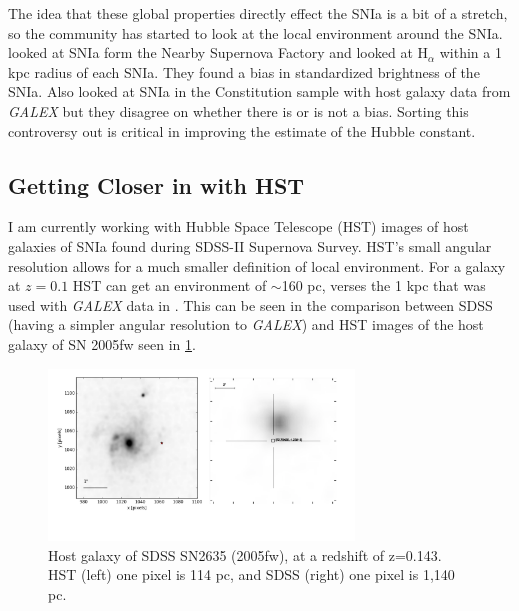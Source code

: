 \documentclass[apj, iop]{emulateapj}
\newcommand{\sn}{SNIa}
\newcommand{\todo}[1]{\textbf{\textcolor{red}{#1}}}
\newcommand{\Hubble}{\ensuremath{\text{H}_0}}
\begin{document}
The idea that these global properties directly effect the \sn{} is a bit of a
stretch, so the community has started to look at the local environment around
the \sn{}. \cite{Rigault13} looked at \sn{} form the Nearby Supernova Factory
and looked at H$_{\alpha}$ within a 1 kpc radius of each \sn{}. They found a
bias in standardized brightness of the \sn{}. Also \cite{Rigault15, Jones15}
looked at \sn{} in the Constitution sample with host galaxy data from {\it
GALEX} but they disagree on whether there is or is not a bias. %
Sorting this controversy out is
critical in improving the estimate of the Hubble constant.

\subsection{Getting Closer in with HST}\label{hst}

I am currently working with Hubble Space Telescope (HST) images of host galaxies
of \sn{} found during SDSS-II Supernova Survey. HST's small angular resolution
allows for a much smaller definition of local environment. For a galaxy at $z =
0.1$ HST can get an environment of $\sim$160 pc, verses the 1 kpc that was used
with {\it GALEX} data in \cite{Jones15,Rigault15}. This can be seen in the
comparison between SDSS (having a simpler angular resolution to {\it GALEX}) and
HST images of the host galaxy of SN 2005fw seen in \cref{f:galaxy-compare}.

\begin{figure}
	\includegraphics[width=3.2in]{SN2635-combined-inverted.pdf}
	\caption{Host galaxy of SDSS SN2635 (2005fw), at a redshift of z=0.143. HST 
	(left) one pixel is 114 pc, and SDSS (right) one pixel is 1,140 pc.}
	\label{f:galaxy-compare}
\end{figure}

\end{document}
